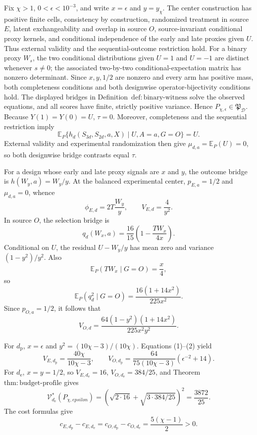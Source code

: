 Fix \(\chi>1\), \(0<\epsilon<10^{-3}\), and write \(x=\epsilon\) and \(y=y_\chi\).  The center construction has positive finite cells, consistency by construction, randomized treatment in source \(E\), latent exchangeability and overlap in source \(O\), source-invariant conditional proxy kernels, and conditional independence of the early and late proxies given \(U\).  Thus external validity and the sequential-outcome restriction hold.  For a binary proxy \(W_s\), the two conditional distributions given \(U=1\) and \(U=-1\) are distinct whenever \(s\ne0\); the associated two-by-two conditional-expectation matrix has nonzero determinant.  Since \(x,y,1/2\) are nonzero and every arm has positive mass, both completeness conditions and both designwise operator-bijectivity conditions hold.  The displayed bridges in Definition~\(\mathrm{def{:}binary\text{-}witness}\) solve the observed equations, and all scores have finite, strictly positive variance.  Hence \(P_{\chi,\epsilon}\in\mathfrak P_{\mathcal D}\).  Because \(Y(1)=Y(0)=U\), \(\tau=0\).  Moreover, completeness and the sequential restriction imply
\[
 \mathbb E_P\{h_d(S_{3d},S_{2d},a,X)\mid U,A=a,G=O\}=U.
\]
External validity and experimental randomization then give \(\mu_{d,a}=\mathbb E_P(U)=0\), so both designwise bridge contrasts equal \(\tau\).

For a design whose early and late proxy signals are \(x\) and \(y\), the outcome bridge is \(h(W_y,a)=W_y/y\).  At the balanced experimental center, \(p_{E,a}=1/2\) and \(\mu_{d,a}=0\), whence
\[
 \phi_{E,d}=2T\frac{W_y}{y},
 \qquad V_{E,d}=\frac4{y^2}. \tag{1}
\]
In source \(O\), the selection bridge is
\[
 q_d(W_x,a)=\frac{16}{15}\left(1-\frac{TW_x}{4x}\right).
\]
Conditional on \(U\), the residual \(U-W_y/y\) has mean zero and variance \((1-y^2)/y^2\).  Also
\[
 \mathbb E_P(TW_x\mid G=O)=\frac{x}{4},
\]
so
\[
 \mathbb E_P(q_d^2\mid G=O)
 =\frac{16(1+14x^2)}{225x^2}.
\]
Since \(p_{O,a}=1/2\), it follows that
\[
 V_{O,d}=\frac{64(1-y^2)(1+14x^2)}{225x^2y^2}. \tag{2}
\]

For \(d_{\mathrm p}\), \(x=\epsilon\) and \(y^2=(10\chi-3)/(10\chi)\).  Equations (1)--(2) yield
\[
 V_{E,d_{\mathrm p}}=\frac{40\chi}{10\chi-3},
 \qquad
 V_{O,d_{\mathrm p}}
 =\frac{64}{75(10\chi-3)}(\epsilon^{-2}+14). \tag{3}
\]
For \(d_{\mathrm e}\), \(x=y=1/2\), so \(V_{E,d_{\mathrm e}}=16\), \(V_{O,d_{\mathrm e}}=384/25\), and Theorem~\(\mathrm{thm{:}budget\text{-}profile}\) gives
\[
 \mathcal V_{d_{\mathrm e}}^*(P_{\chi,epsilon})
 =\left(\sqrt{2\cdot16}+\sqrt{3\cdot384/25}\right)^2
 =\frac{3872}{25}. \tag{4}
\]
The cost formulas give
\[
 c_{E,d_{\mathrm p}}-c_{E,d_{\mathrm e}}
 =c_{O,d_{\mathrm p}}-c_{O,d_{\mathrm e}}
 =\frac{5(\chi-1)}2>0. \tag{5}
\]

